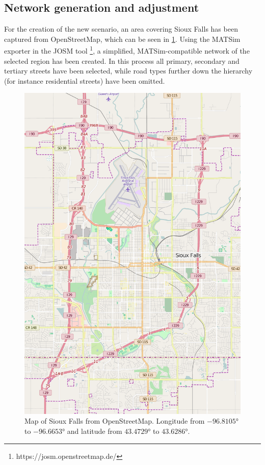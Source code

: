 \subsection{Network generation and adjustment}

For the creation of the new scenario, an area covering Sioux Falls has been captured
from OpenStreetMap, which can be seen in \cref{fig:original_map}. Using the MATSim
exporter in the JOSM tool \footnote{https://josm.openstreetmap.de/}, a simplified,
MATSim-compatible network of the selected region has been created. In this process
all primary, secondary and tertiary streets have been selected, while road types
further down the hierarchy (for instance residential streets) have been omitted.

\begin{figure}
    \centering
    \includegraphics[width=\textwidth]{figures/original_map.pdf}
    \caption{Map of Sioux Falls from OpenStreetMap. Longitude from $-96.8105°$ to $-96.6653°$ and latitude from $43.4729°$ to $43.6286°$.}
    \label{fig:original_map}
\end{figure}

